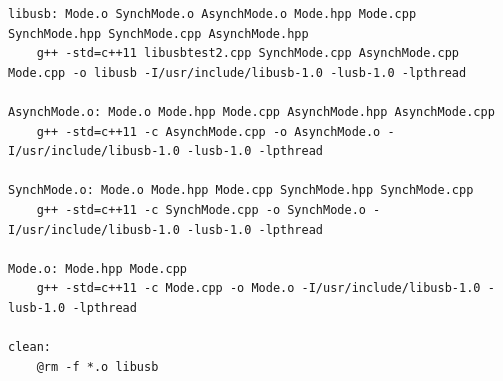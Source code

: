 \documentclass{BscUS}
\begin{document}
\begin{lstlisting}[caption={Makefile},label={lst:makefile}]
libusb: Mode.o SynchMode.o AsynchMode.o Mode.hpp Mode.cpp SynchMode.hpp SynchMode.cpp AsynchMode.hpp
	g++ -std=c++11 libusbtest2.cpp SynchMode.cpp AsynchMode.cpp Mode.cpp -o libusb -I/usr/include/libusb-1.0 -lusb-1.0 -lpthread

AsynchMode.o: Mode.o Mode.hpp Mode.cpp AsynchMode.hpp AsynchMode.cpp
	g++ -std=c++11 -c AsynchMode.cpp -o AsynchMode.o -I/usr/include/libusb-1.0 -lusb-1.0 -lpthread

SynchMode.o: Mode.o Mode.hpp Mode.cpp SynchMode.hpp SynchMode.cpp
	g++ -std=c++11 -c SynchMode.cpp -o SynchMode.o -I/usr/include/libusb-1.0 -lusb-1.0 -lpthread

Mode.o: Mode.hpp Mode.cpp
	g++ -std=c++11 -c Mode.cpp -o Mode.o -I/usr/include/libusb-1.0 -lusb-1.0 -lpthread

clean:
	@rm -f *.o libusb
\end{lstlisting}
\end{document}
